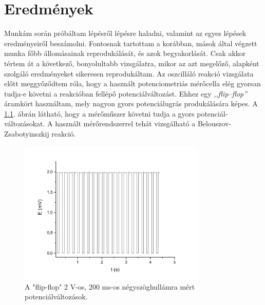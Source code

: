 \chapter{Eredmények}
\pagestyle{headings}

\def\s{0.5}
Munkám során próbáltam lépésről lépésre haladni, valamint az egyes lépések eredményeiről beszámolni. Fontosnak tartottam a korábban, mások által végzett munka főbb állomásainak reprodukálását, és azok begyakorlását. Csak akkor tértem át a következő, bonyolultabb vizsgálatra, mikor az azt megelőző, alapként szolgáló eredményeket sikeresen reprodukáltam. Az oszcilláló reakció vizsgálata előtt meggyőződtem róla, hogy a használt potenciometriás mérőcella elég gyorsan tudja-e követni a reakcióban fellépő potenciálváltozást. Ehhez egy \emph{,,flip--flop''} áramkört használtam, mely nagyon gyors potenciálugrás produkálására képes. A \ref{fig:square}. ábrán látható, hogy a mérőműszer követni tudja a gyors potenciál-változásokat. A használt mérőrendszerrel tehát vizsgálható a Belouszov-Zsabotyinszkij reakció.

\begin{figure}
\centering
\includegraphics[width=0.8\textwidth]{img/square.jpg}
\caption{A "flip-flop" 2 V-os, 200 ms-os négyszöghullámra mért potenciálváltozások.}
\label{fig:square}
\end{figure}

